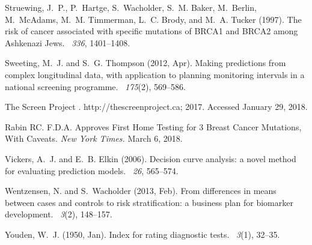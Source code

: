 \documentclass[11pt, letterpaper]{article}
\begin{document}
\begin{thebibliography}{}
	Struewing, J.~P., P.~Hartge, S.~Wacholder, S.~M. Baker, M.~Berlin, M.~McAdams,
	M.~M. Timmerman, L.~C. Brody, and M.~A. Tucker (1997).
	\newblock The risk of cancer associated with specific mutations of {BRCA1} and
	{BRCA2} among {A}shkenazi {J}ews.
	~{\em 336}, 1401--1408.
	
	Sweeting, M.~J. and S.~G. Thompson (2012, Apr).
	\newblock Making predictions from complex longitudinal data, with application
	to planning monitoring intervals in a national screening programme.
	~{\em 175\/}(2), 569--586.
	
	{The Screen Project} . {http://thescreenproject.ca}; 2017.
	\newblock Accessed January 29, 2018.
	
	Rabin RC. {F.D.A.} Approves First Home Testing for 3 Breast Cancer
	Mutations, With Caveats.  {\it {New York Times}. }{March 6, 2018}.
	
	
	Vickers, A.~J. and E.~B. Elkin (2006).
	\newblock Decision curve analysis: a novel method for evaluating prediction
	models.
	~{\em 26}, 565--574.
	
	Wentzensen, N. and S.~Wacholder (2013, Feb).
	\newblock From differences in means between cases and controls to risk
	stratification: a business plan for biomarker development.
	~{\em 3\/}(2), 148--157.
	
	Youden, W.~J. (1950, Jan).
	\newblock Index for rating diagnostic tests.
	~{\em 3\/}(1), 32--35.
	
\end{thebibliography}



\newpage
\setcounter{page}{0}   %
\end{document}
